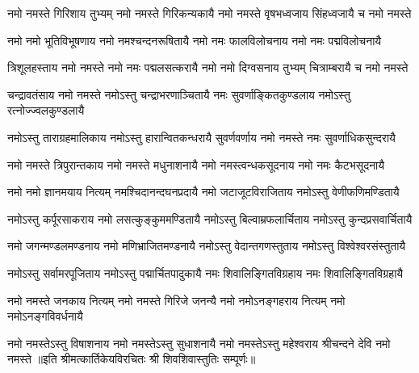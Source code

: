 
\fourlineindentedshloka
{नमो नमस्ते गिरिशाय तुभ्यम्}
{नमो नमस्ते गिरिकन्यकायै}
{नमो नमस्ते वृषभध्वजाय}
{सिंहध्वजायै च नमो नमस्ते}

\fourlineindentedshloka
{नमो नमो भूतिविभूषणाय}
{नमो नमश्चन्दनरूषितायै}
{नमो नमः फालविलोचनाय}
{नमो नमः पद्मविलोचनायै}

\fourlineindentedshloka
{त्रिशूलहस्ताय नमो नमस्ते}
{नमो नमः पद्मलसत्करायै}
{नमो नमो दिग्वसनाय तुभ्यम्}
{चित्राम्बरायै च नमो नमस्ते}

\fourlineindentedshloka
{चन्द्रावतंसाय नमो नमस्ते}
{नमोऽस्तु चन्द्राभरणाञ्चितायै}
{नमः सुवर्णाङ्कितकुण्डलाय}
{नमोऽस्तु रत्नोज्ज्वलकुण्डलायै}

\fourlineindentedshloka
{नमोऽस्तु ताराग्रहमालिकाय}
{नमोऽस्तु हारान्वितकन्धरायै}
{सुवर्णवर्णाय नमो नमस्ते}
{नमः सुवर्णाधिकसुन्दरायै}

\fourlineindentedshloka
{नमो नमस्ते त्रिपुरान्तकाय}
{नमो नमस्ते मधुनाशनायै}
{नमो नमस्त्वन्धकसूदनाय}
{नमो नमः कैटभसूदनायै}

\fourlineindentedshloka
{नमो नमो ज्ञानमयाय नित्यम्}
{नमश्चिदानन्दघनप्रदायै}
{नमो जटाजूटविराजिताय}
{नमोऽस्तु वेणीफणिमण्डितायै}

\fourlineindentedshloka
{नमोऽस्तु कर्पूरसाकराय}
{नमो लसत्कुङ्कुममण्डितायै}
{नमोऽस्तु बिल्वाम्रफलार्चिताय}
{नमोऽस्तु कुन्दप्रसवार्चितायै}

\fourlineindentedshloka
{नमो जगन्मण्डलमण्डनाय}
{नमो मणिभ्राजितमण्डनायै}
{नमोऽस्तु वेदान्तगणस्तुताय}
{नमोऽस्तु विश्वेश्वरसंस्तुतायै}

\fourlineindentedshloka
{नमोऽस्तु सर्वामरपूजिताय}
{नमोऽस्तु पद्मार्चितपादुकायै}
{नमः शिवालिङ्गितविग्रहाय}
{नमः शिवालिङ्गितविग्रहायै}

\fourlineindentedshloka
{नमो नमस्ते जनकाय नित्यम्}
{नमो नमस्ते गिरिजे जनन्यै}
{नमो नमोऽनङ्गहराय नित्यम्}
{नमो नमोऽनङ्गविवर्धनायै}

\fourlineindentedshloka
{नमो नमस्तेऽस्तु विषाशनाय}
{नमो नमस्तेऽस्तु सुधाशनायै}
{नमो नमस्तेऽस्तु महेश्वराय}
{श्रीचन्दने देवि नमो नमस्ते}
॥इति श्रीमत्कार्तिकेयविरचितः श्री शिवशिवास्तुतिः सम्पूर्णः॥